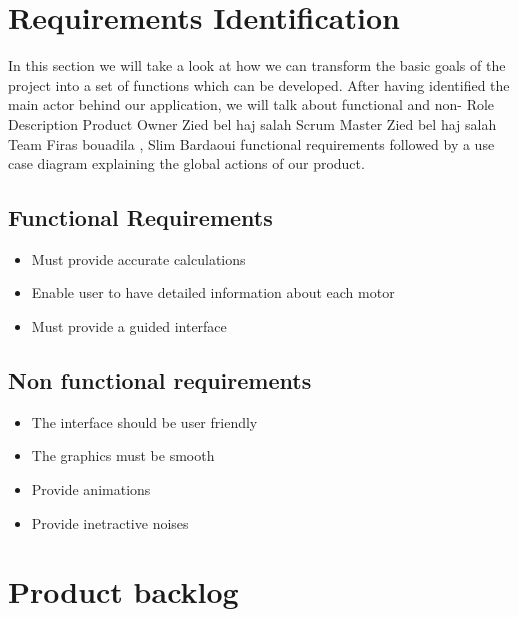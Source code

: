 \documentclass[]{report}
\begin{document}
\section{Requirements Identification}
In this section we will take a look at how we can transform
the basic goals of the project into a set of functions which
can be developed.
After having identified the main actor behind our
application, we will talk about functional and non-
Role Description
Product Owner Zied bel haj salah
Scrum Master Zied bel haj salah
Team Firas bouadila , Slim
Bardaoui
functional requirements followed by a use case diagram
explaining the global actions of our product.

\subsection{Functional Requirements}
\begin{itemize}
	\item Must provide accurate calculations
	\item Enable user to have detailed information about each
	motor
	\item Must provide a guided interface
\end{itemize}

\subsection{Non functional requirements}
\begin{itemize}
	\item The interface should be user friendly
	\item The graphics must be smooth
	\item Provide animations
	\item Provide inetractive noises
\end{itemize}
\section{Product backlog}
\end{document}
